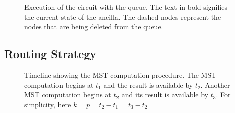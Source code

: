 \begin{figure}
    \centering
    
    \caption{Execution of the circuit with the queue. The text in bold signifies the current state of the ancilla. The dashed nodes represent the nodes that are being deleted from the queue.}
    \label{fig:queue_timeline}
\end{figure}

\subsection{Routing Strategy}\label{section:efficientmst}
\begin{figure}
    \centering
    
    \caption{Timeline showing the MST computation procedure. The MST computation begins at $t_1$ and the result is available by $t_2$. Another MST computation begins at $t_2$ and its result is available by $t_3$. For simplicity, here $k = p = t_2 - t_1 = t_3 - t_2$}
    \label{fig:mst_selection}
\end{figure}
